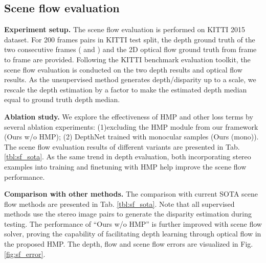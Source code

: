 \documentclass[runningheads]{llncs}
\begin{document}
\vspace{-0.3\baselineskip}
\subsection{Scene flow evaluation}
\vspace{-0.3\baselineskip}
\label{sf_exp}
\noindent\textbf{Experiment setup.}
The scene flow evaluation is performed on KITTI 2015 dataset. For 200 frames pairs in KITTI test split, the depth ground truth of the two consecutive frames ( and ) and the 2D optical flow ground truth from frame  to frame  are provided. Following the KITTI benchmark evaluation toolkit, the scene flow evaluation is conducted on the two depth results and optical flow results. As the unsupervised method generates depth/disparity up to a scale, we rescale the depth estimation by a factor to make the estimated depth median equal to ground truth depth median.



\vspace{0.5\baselineskip}
\noindent\textbf{Ablation study.}
We explore the effectiveness of HMP and other loss terms by several ablation experiments: (1)excluding the HMP module from our framework (Ours w/o HMP); (2) DepthNet trained with monocular samples (Ours (mono)). The scene flow evaluation results of different variants are presented in Tab. \ref{tbl:sf_sota}. As the same trend in depth evaluation, both incorporating stereo examples into training and finetuning with HMP help improve the scene flow performance.

\vspace{0.5\baselineskip}
\noindent\textbf{Comparison with other methods.}
The comparison with current SOTA scene flow methods are presented in Tab. \ref{tbl:sf_sota}. Note that all supervised methods use the stereo image pairs to generate the disparity estimation during testing. 
The performance of ``Ours w/o HMP'' is further improved with scene flow solver, proving the capability of facilitating depth learning through optical flow in the proposed HMP. The depth, flow and scene flow errors are visualized in Fig. \ref{fig:sf_error}.
\end{document}
